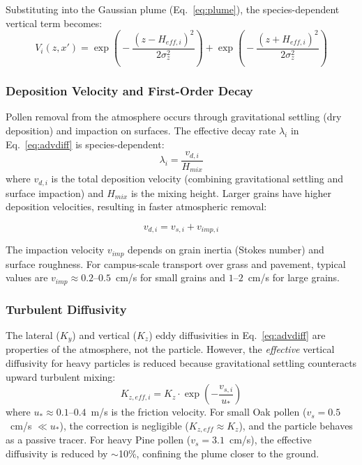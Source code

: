 \documentclass[11pt]{article}
\begin{document}
Substituting into the Gaussian plume (Eq.~\ref{eq:plume}), the species-dependent vertical term becomes:
\begin{equation}
V_i(z, x') = \exp\!\left(\!-\frac{(z - H_{eff,i})^2}{2\sigma_z^2}\right) + \exp\!\left(\!-\frac{(z + H_{eff,i})^2}{2\sigma_z^2}\right)
\end{equation}

\subsubsection{Deposition Velocity and First-Order Decay}

Pollen removal from the atmosphere occurs through gravitational settling (dry deposition) and impaction on surfaces. The effective decay rate $\lambda_i$ in Eq.~\eqref{eq:advdiff} is species-dependent:
\begin{equation}
\lambda_i = \frac{v_{d,i}}{H_{mix}}
\label{eq:decay}
\end{equation}
where $v_{d,i}$ is the total deposition velocity (combining gravitational settling and surface impaction) and $H_{mix}$ is the mixing height. Larger grains have higher deposition velocities, resulting in faster atmospheric removal:

\begin{equation}
v_{d,i} = v_{s,i} + v_{imp,i}
\end{equation}

The impaction velocity $v_{imp}$ depends on grain inertia (Stokes number) and surface roughness. For campus-scale transport over grass and pavement, typical values are $v_{imp} \approx 0.2$--$0.5$~cm/s for small grains and $1$--$2$~cm/s for large grains.

\subsubsection{Turbulent Diffusivity}

The lateral ($K_y$) and vertical ($K_z$) eddy diffusivities in Eq.~\eqref{eq:advdiff} are properties of the atmosphere, not the particle. However, the \emph{effective} vertical diffusivity for heavy particles is reduced because gravitational settling counteracts upward turbulent mixing:
\begin{equation}
K_{z,eff,i} = K_z \cdot \exp\!\left(-\frac{v_{s,i}}{u_*}\right)
\label{eq:kz_eff}
\end{equation}
where $u_* \approx 0.1$--$0.4$~m/s is the friction velocity. For small Oak pollen ($v_s = 0.5$~cm/s $\ll u_*$), the correction is negligible ($K_{z,eff} \approx K_z$), and the particle behaves as a passive tracer. For heavy Pine pollen ($v_s = 3.1$~cm/s), the effective diffusivity is reduced by $\sim$10\%, confining the plume closer to the ground.
\end{document}
